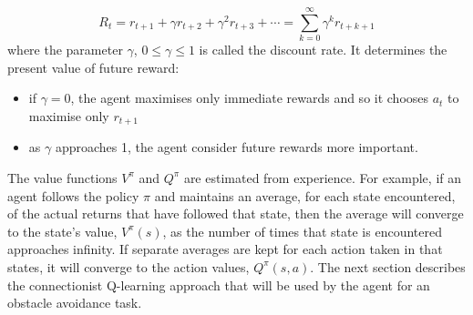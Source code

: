 \begin{equation}
 R_t=r_{t+1}+\gamma r_{t+2}+ \gamma^2 r_{t+3}+\cdots =\sum_{k=0}^{\infty} \gamma^k r_{t+k+1} \label{eq:Qlearn.Rinf}
\end{equation}
where the parameter $\gamma$, $0\leq \gamma \leq 1$ is called the discount rate.
It determines the present value of future reward:
\begin{itemize}
 \item if $\gamma=0$, the agent maximises only immediate rewards and so
it chooses $a_t$ to maximise only $r_{t+1}$
 \item as $\gamma $ approaches 1, the agent consider future rewards more important.
\end{itemize}
The value functions $V^\pi$ and $Q^\pi$ are estimated from experience.
For example, if an agent follows the policy $\pi$
and maintains an average, for each state encountered, of the actual returns that
have followed that state, then the average
 will converge to the state's value, $V^\pi(s)$, as the number of times that
state is encountered approaches infinity.
If separate averages are kept for each action taken in that states, it will
converge to the action values, $Q^\pi(s,a)$.
The next section describes the connectionist Q-learning approach that will be
used by the agent for an obstacle avoidance task.

